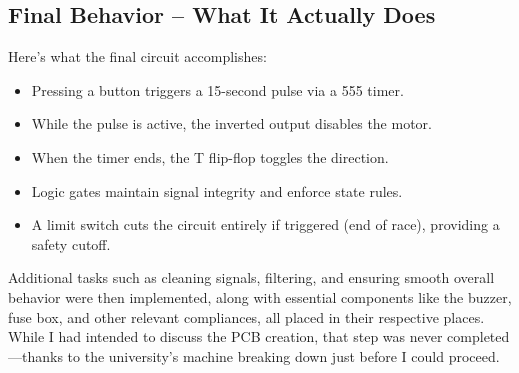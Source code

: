 \documentclass{article}
\begin{document}
\subsection{Final Behavior -- What It Actually Does}
Here’s what the final circuit accomplishes:
\begin{itemize}[itemsep=-1mm]
	\item Pressing a {button} triggers a 15-second pulse via a {555 timer}.
	\item While the pulse is active, the {inverted output} disables the motor.
	\item When the timer ends, the {T flip-flop toggles} the direction.
	\item Logic gates maintain signal integrity and enforce state rules.
	\item A {limit switch} cuts the circuit entirely if triggered (end of race), providing a safety cutoff.
\end{itemize}
Additional tasks such as cleaning signals, filtering, and ensuring smooth overall behavior were then implemented, along with essential components like the buzzer, fuse box, and other relevant compliances, all placed in their respective places.\\[8pt]
While I had intended to discuss the PCB creation, that step was never completed---thanks to the university's machine breaking down just before I could proceed.
\end{document}

